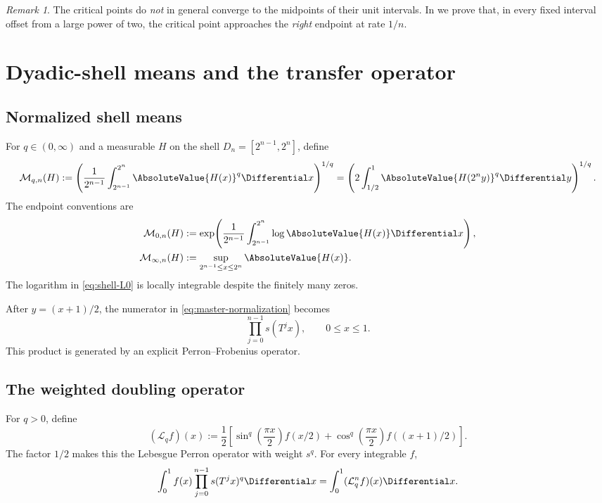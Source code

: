 \documentclass[11pt,oneside]{article}
\theoremstyle{definition}
\theoremstyle{remark}
\newtheorem{remark}[remark]{Remark}
\begin{document}
\begin{remark}
The critical points do \emph{not} in general converge to the midpoints of their unit
intervals.  In  we prove that, in every fixed interval offset
from a large power of two, the critical point approaches the \emph{right} endpoint at rate
$1/n$.
\end{remark}

\section{Dyadic-shell means and the transfer operator}
\label{sec:Lq-spectrum}

\subsection{Normalized shell means}

For $q\in(0,\infty)$ and a measurable $H$ on the shell
$D_n=[2^{n-1},2^n]$, define
\begin{equation}
 \mathcal M_{q,n}(H)
 :=\left(\frac1{2^{n-1}}\int_{2^{n-1}}^{2^n}\AbsoluteValue{H(x)}^q\Differential x\right)^{1/q}
 =\left(2\int_{1/2}^{1}\AbsoluteValue{H(2^ny)}^q\Differential y\right)^{1/q}.
 \label{eq:shell-Lq}
\end{equation}
The endpoint conventions are
\begin{align}
 \mathcal M_{0,n}(H)
 &:=\exp\!\left(\frac1{2^{n-1}}
       \int_{2^{n-1}}^{2^n}\log\AbsoluteValue{H(x)}\Differential x\right),
 \label{eq:shell-L0}\\
 \mathcal M_{\infty,n}(H)
 &:=\sup_{2^{n-1}\le x\le2^n}\AbsoluteValue{H(x)}.
 \label{eq:shell-Linf}
\end{align}
The logarithm in \eqref{eq:shell-L0} is locally integrable despite the finitely many zeros.

After $y=(x+1)/2$, the numerator in \eqref{eq:master-normalization} becomes
\begin{equation}
 \prod_{j=0}^{n-1}s(T^jx),
 \qquad 0\le x\le1.
 \label{eq:forward-product}
\end{equation}
This product is generated by an explicit Perron--Frobenius operator.

\subsection{The weighted doubling operator}

For $q>0$, define
\begin{equation}
 (\mathcal L_q f)(x)
 :=\frac12\left[
   \sin^q\!\left(\frac{\pi x}{2}\right)f(x/2)
  +\cos^q\!\left(\frac{\pi x}{2}\right)f((x+1)/2)
 \right].
 \label{eq:transfer-operator}
\end{equation}
The factor $1/2$ makes this the Lebesgue Perron operator with weight $s^q$.
For every integrable $f$,
\begin{equation}
 \int_0^1 f(x)\prod_{j=0}^{n-1}s(T^jx)^q\Differential x
 =\int_0^1(\mathcal L_q^n f)(x)\Differential x.
 \label{eq:transfer-duality}
\end{equation}
\end{document}

